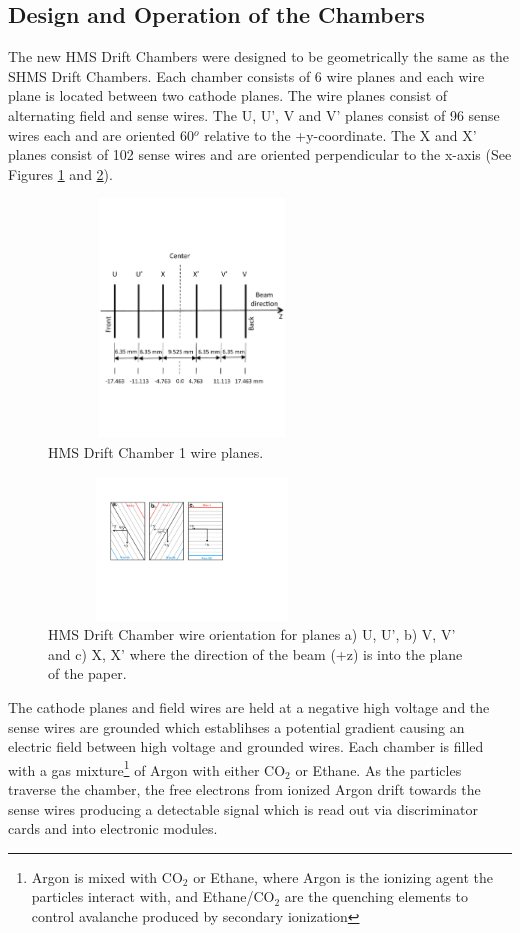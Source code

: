 \documentclass[letterpaper, 12 pt, conference]{ieeeconf}  %
\begin{document}
\subsection{Design and Operation of the Chambers}
\noindent The new HMS Drift Chambers were designed to be geometrically the same as the SHMS Drift Chambers. Each chamber consists of 6 wire planes and each wire
plane is located between two cathode planes. The wire planes consist of alternating field and sense wires. The U, U', V and V' planes consist of
96 sense wires each and are oriented 60$^{o}$ relative to the +y-coordinate. The X and X' planes consist of 102 sense wires and are oriented perpendicular to the x-axis (See
Figures \ref{fig:dc1_planes} and \ref{fig:dc_wires}).
\begin{figure}[h!]
  \centering
  \includegraphics[width=3.0in, height=2.5in]{dc2_tests/HMS_DC1_Planes.pdf}
  \caption{HMS Drift Chamber 1 wire planes.}
  \label{fig:dc1_planes}
\end{figure}
\begin{figure}[h!]
  \centering
  \includegraphics[width=3.0in, height=1.5in]{dc2_tests/HMS_DC_Wires.pdf}
  \caption{HMS Drift Chamber wire orientation for planes a) U, U', b) V, V' and c) X, X' where
  the direction of the beam (+z) is into the plane of the paper.}
  \label{fig:dc_wires}
\end{figure}
The cathode planes and field wires are held at a negative high voltage and the sense wires are grounded which establihses a potential gradient causing an electric field
between high voltage and grounded wires. Each chamber is filled with a gas mixture\footnote{Argon is mixed with CO$_{2}$ or Ethane, where Argon is the ionizing agent the
particles interact with, and Ethane/CO$_{2}$ are the quenching elements to control avalanche produced by secondary ionization} of Argon with either CO$_{2}$ or Ethane.
As the particles traverse the chamber, the free electrons from ionized Argon drift towards the sense wires producing a detectable signal which is read out via discriminator
cards and into electronic modules.
\end{document}
